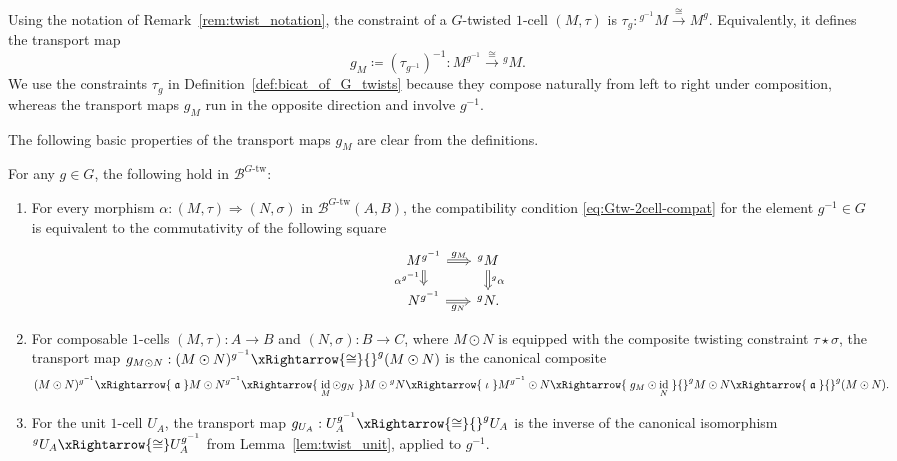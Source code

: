 \documentclass[11pt,oneside]{amsart}
\DeclareMathOperator{\id}{id}
\numberwithin{equation}{section}
\numberwithin{figure}{section}
\theoremstyle{plain}
\theoremstyle{definition}
\theoremstyle{remark}
\begin{document}
\begin{remark}\label{rem:twist_notation_and_consistency}
Using the notation of Remark~\ref{rem:twist_notation}, the constraint of a
\(G\)-twisted \(1\)-cell \((M,\tau)\) is
\(
\tau_{g}:{}^{g^{-1}}M \xrightarrow{\cong} M^g.
\)
Equivalently, it defines the transport map
\begin{equation}\label{eq:g_M_def}
g_M \coloneqq (\tau_{g^{-1}})^{-1}: M^{g^{-1}} \xrightarrow{\cong} {}^gM.
\end{equation}
We use the constraints \(\tau_{g}\) in Definition~\ref{def:bicat_of_G_twists} because they compose naturally from left to right under composition, whereas the transport maps \(g_M\) run in the opposite direction and involve \(g^{-1}\).
\end{remark}


The following basic properties of the transport maps \(g_M\) are clear from the definitions.

\begin{lemma}\label{lem:gM-coherence}
For any $g\in G$, the following hold in $\mathcal B^{G\text{-tw}}$:
\begin{enumerate}
\item[(1)]
For every morphism
\(
\alpha:(M,\tau)\Rightarrow (N,\sigma)
\)
in \(\mathcal B^{G\text{-tw}}(A,B)\),     the compatibility condition
\eqref{eq:Gtw-2cell-compat} for the element \(g^{-1}\in G\) is equivalent to the commutativity of the following square
\[
\begin{tikzcd}[column sep=6mm, row sep=4mm]
M^{g^{-1}} \arrow[r,Rightarrow,"g_M"] \arrow[d,Rightarrow,"\alpha^{g^{-1}}"']
& {}^gM \arrow[d,Rightarrow,"{}^g\alpha"] \\
N^{g^{-1}} \arrow[r,Rightarrow,"g_N"']
& {}^gN.
\end{tikzcd}
\]

\item[(2)] For composable \(1\)-cells \((M,\tau):A\to B\) and \((N,\sigma):B\to C\), where
\(M\odot N\) is equipped with the composite twisting constraint
\(\tau\star\sigma\), the transport map
\(
g_{M\odot N}:(M\odot N)^{g^{-1}}\xRightarrow{\cong} {}^g(M\odot N)
\)
is the canonical composite
\begin{equation}\label{eq:gMN-formula}
(M\odot N)^{g^{-1}}
\xRightarrow{\;\mathfrak a\;}
M\odot N^{g^{-1}}
\xRightarrow{\;\id_M\odot g_N\;}
M\odot {}^gN
\xRightarrow{\;\iota\;}
M^{g^{-1}}\odot N
\xRightarrow{\;g_M\odot \id_N\;}
{}^gM\odot N
\xRightarrow{\;\mathfrak a\;}
{}^g(M\odot N).
\end{equation}

\item[(3)] For the unit \(1\)-cell \(U_A\), the transport map
\(
g_{U_A}:U_A^{g^{-1}}\xRightarrow{\cong}{}^gU_A
\)
is the inverse of the canonical isomorphism
\(
{}^gU_A\xRightarrow{\cong}U_A^{g^{-1}}
\)
from Lemma~\ref{lem:twist_unit}, applied to \(g^{-1}\).
\end{enumerate}
\end{lemma}
\end{document}
